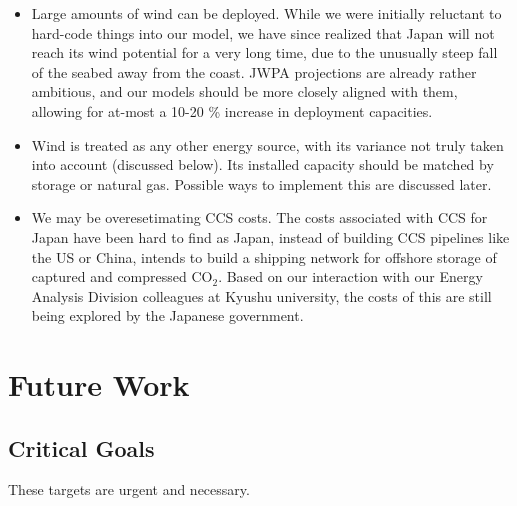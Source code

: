 \documentclass[14pt,a4paper]{article} %
\begin{document}
\begin{enumerate}
\begin{itemize}
\item Large amounts of wind can be deployed. While we were initially reluctant to hard-code things into our model, we have since realized that Japan will not reach its wind potential for a very long time, due to the unusually steep fall of the seabed away from the coast. JWPA projections \cite{heger_wind_2016} are already rather ambitious, and our models should be more closely aligned with them, allowing for at-most a 10-20 \% increase in deployment capacities.

\item Wind is treated as any other energy source, with its variance not truly taken into account (discussed below). Its installed capacity should be matched by storage or natural gas. Possible ways to implement this are discussed later.

\item We may be overesetimating CCS costs. The costs associated with CCS for Japan have been hard to find as Japan, instead of building CCS pipelines like the US or China, intends to build a shipping network for offshore storage of captured and compressed CO$_2$. Based on our interaction with our Energy Analysis Division colleagues at Kyushu university, the costs of this are still being explored by the Japanese government.

\end{itemize}

\end{enumerate}

\section{Future Work} 

\subsection{Critical Goals}
These targets are urgent and necessary.
\end{document}
